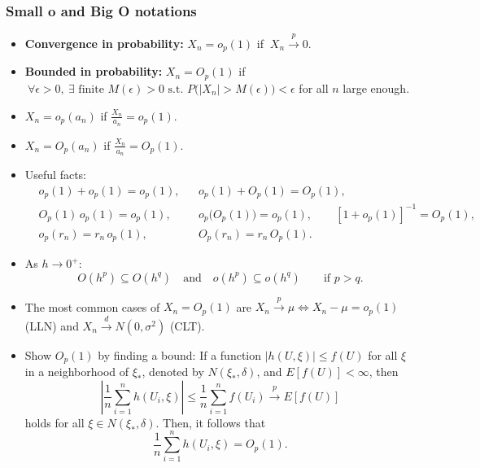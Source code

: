 \documentclass{article}
\theoremstyle{break}
\begin{document}
\subsubsection{Small o and Big O notations}
\begin{itemize}
    \item \textbf{Convergence in probability:} $X_n = o_p(1)$ if $\ X_n \stackrel{p}{\to} 0$.
    \item \textbf{Bounded in probability:} $X_n = O_p(1)$ if $\ \forall \epsilon > 0,\ \exists \text{ finite } M(\epsilon) > 0 \text{ s.t. } P\big(|X_n| > M(\epsilon)\big) < \epsilon$ for all $n$ large enough.
    \item $X_n=o_p(a_n)$ if $\frac{X_n}{a_n} = o_p(1)$.
    \item $X_n=O_p(a_n)$ if $\frac{X_n}{a_n} = O_p(1)$.
    \item Useful facts:
    \[
    \begin{aligned}
        & o_p(1)+o_p(1)=o_p(1), && o_p(1)+O_p(1)=O_p(1),\\
        & O_p(1)\,o_p(1)=o_p(1), && o_p \big(O_p(1)\big)=o_p(1),\qquad [1+o_p(1)]^{-1}=O_p(1),\\
        & o_p(r_n)=r_n\,o_p(1), && O_p(r_n)=r_n\,O_p(1).
    \end{aligned}
    \]
    \item As $h\to 0^+$:
    \[
    O(h^p)\subseteq O(h^q) 
    \quad\text{and}\quad
    o(h^p)\subseteq o(h^q) 
    \qquad\text{if }p>q.
    \]
    \item The most common cases of $X_n = O_p(1)$ are $X_n \stackrel{p}{\to} \mu \Leftrightarrow X_n - \mu = o_p(1)$ (LLN) and $X_n \stackrel{d}{\to} N(0,\sigma^2)$ (CLT).
    \item Show $O_p(1)$ by finding a bound: If a function $|h(U,\xi)| \le f(U)$ for all $\xi$ in a neighborhood of $\xi_*$, denoted by $N(\xi_*,\delta)$, and $E[f(U)] < \infty$, then
    \[
    \left| \frac{1}{n} \sum_{i=1}^n h(U_i,\xi) \right|
      \le \frac{1}{n} \sum_{i=1}^n f(U_i)
      \stackrel{p}{\to} E[f(U)]
    \]
    holds for all $\xi \in N(\xi_*,\delta)$. Then, it follows that
    \[
    \frac{1}{n} \sum_{i=1}^n h(U_i,\xi) = O_p(1).
    \]
\end{itemize}

\end{document}
